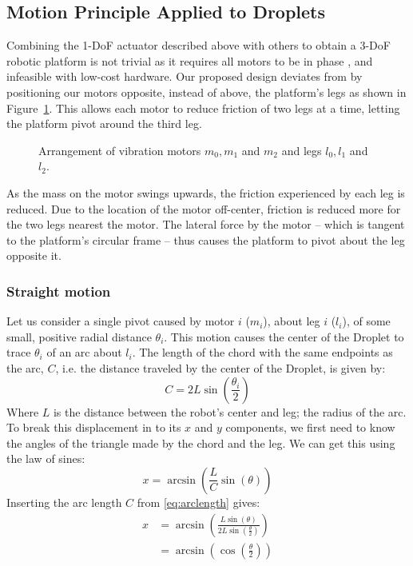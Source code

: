 \documentclass[letterpaper, 10pt, conference]{ieeeconf}
\begin{document}
\subsection{Motion Principle Applied to Droplets}
Combining the 1-DoF actuator described above with others to obtain a 3-DoF robotic platform is not trivial as it requires all motors to be in phase \cite{Vartholomeos2005}, and infeasible with low-cost hardware. Our proposed design deviates from \cite{Vartholomeos2005} by positioning our motors opposite, instead of above, the platform's legs as shown in Figure~\ref{dropletMotorDiagram}. This allows each motor to reduce friction of two legs at a time, letting the platform pivot around the third leg. 


\begin{figure}
\centering

\caption{Arrangement of vibration motors $m_0, m_1$ and $m_2$ and legs $l_0, l_1$ and $l_2$.}
\label{dropletMotorDiagram}
\end{figure}

As the mass on the motor swings upwards, the friction experienced by each leg is reduced. Due to the location of the motor off-center, friction is reduced more for the two legs nearest the motor. The lateral force by the motor -- which is tangent to the platform's circular frame -- thus causes the platform to pivot about the leg opposite it.



\subsubsection{Straight motion}
Let us consider a single pivot caused by motor $i$ ($m_i$), about leg $i$ ($l_i$), of some small, positive radial distance $\theta_i$. This motion causes the center of the Droplet to trace $\theta_i$ of an arc about $l_i$. The length of the chord with the same endpoints as the arc, $C$, i.e. the distance traveled by the center of the Droplet, is given by:
\begin{equation}\label{eq:arclength}
C=2 L \sin\left(\frac{\theta_i}{2}\right)
\end{equation}
Where $L$ is the distance between the robot's center and leg; the radius of the arc. To break this displacement in to its $x$ and $y$ components, we first need to know the angles of the triangle made by the chord and the leg. We can get this using the law of sines:
\begin{equation}
x = \arcsin\left(\frac{L}{C}\sin(\theta)\right) 
\end{equation}
Inserting the arc length $C$ from \ref{eq:arclength} gives:
\begin{align}
x &=\arcsin\left(\frac{L\sin(\theta)}{2 L \sin(\frac{\theta}{2})}\right) \\
\nonumber
   &=\arcsin\left(\cos\left(\frac{\theta}{2}\right)\right)
\end{align}
\end{document}
